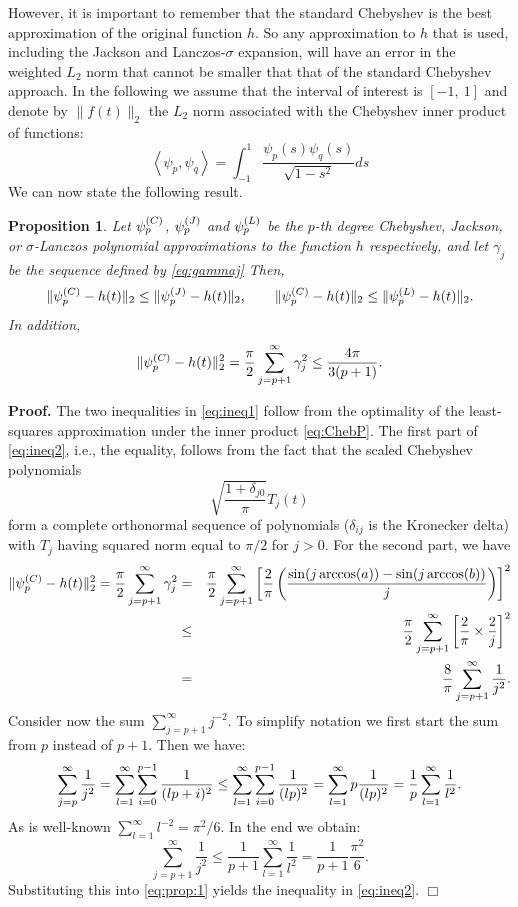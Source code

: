 \documentclass[12pt]{article}		\usepackage{tabls,multirow}
\newtheorem{proposition}{Proposition}[section]
\newenvironment{proof}{\begin{trivlist}
                       \item[]{\bf Proof.}
                       \hspace{0cm} }{\hfill $\Box$
                       \end{trivlist}}
\newcommand{\eq}[1]{\begin{equation}\label{#1}}
\newcommand{\en}{\end{equation}}
\begin{document}
However, it is important to remember that the standard Chebyshev is
the best approximation of the original function $h$. So any
approximation to $h$ that is used, including the Jackson and
Lanczos-$\sigma$ expansion, will have an error in the weighted $L_2$
norm that cannot be smaller that that of the standard Chebyshev
approach.  In the following we assume that the interval of interest is
$[-1, \ 1]$ and denote by $\| f(t)\|_2$ the $L_2$ norm associated with
the Chebyshev inner product of functions: \eq{eq:ChebP} \left\langle
  \psi_p, \psi_q \right\rangle = \int_{-1}^{1} \frac{\psi_p(s)
  \psi_q(s)}{\sqrt{1 - s^2}}ds \en We can now state the following
result.
\begin{proposition}\label{lem:ineq}
Let $\psi_p^{({C})}$, $\psi_p^{({J})}$ and $\psi_p^{({L})}$  
be the $p$-th degree Chebyshev,  Jackson, or
$\sigma$-Lanczos polynomial approximations to the function $h$
respectively, and let $\gamma_j$ be the sequence defined by 
\eqref{eq:gammaj} 
Then, 
\eq{eq:ineq1}
\| \psi_p\upp{C} -  h(t) \|_2 \le \| \psi_p\upp{J} -  h(t) \|_2, 
\qquad \| \psi_p\upp{C} -  h(t) \|_2 \le \| \psi_p\upp{L} -  h(t) \|_2 . 
\en
In addition, 
\eq{eq:ineq2}
\| \psi_p\upp{C} -  h(t) \|_2^2 = \frac{\pi}{2} \sum_{j=p+1}^\infty \gamma_j^2 \le \frac{4 \pi }{3(p+1)} .  
\en
\end{proposition} 
\begin{proof}
The two 
inequalities in \eqref{eq:ineq1} follow from the optimality of the least-squares
approximation under the inner product \eqref{eq:ChebP}.
The first part of  \eqref{eq:ineq2}, i.e., the equality, follows from 
the fact that the scaled Chebyshev polynomials 
\[ \sqrt{ \frac{1+ \delta_{j0}}{\pi}} T_j(t) \] form a complete
orthonormal sequence of polynomials ($\delta_{ij}$ is the Kronecker
delta) with $T_j$ having squared norm equal to $\pi/2$ for
$j>0$.  For the second part, we have
\begin{eqnarray} 
\| \psi_p^{({C})} -  h(t) \|_2^2 = \frac{\pi}{2} \sum_{j=p+1}^\infty \gamma_j^2 
&=&  
\frac{\pi}{2} \sum_{j=p+1}^\infty 
\left[
\frac{2}{\pi}\left(
 \frac{\sin(j\arccos(a)) - \sin(j\arccos(b))}{j}
\right)\right]^2 \nonumber  \\
&\le &  
\frac{\pi}{2} \sum_{j=p+1}^\infty 
\left[
\frac{2}{\pi} \times 
 \frac{2}{j}
\right]^2 \nonumber  \\
& = &
\frac{8}{ \pi }
\sum_{j=p+1}^\infty 
\frac{1}{j^2}  . \label{eq:prop:1}
\end{eqnarray} 
Consider now the sum $\sum_{j=p+1}^\infty j^{-2}$. To simplify notation
we first start the sum from $p$ instead of $p+1$. Then we have:
\[
\sum_{j=p}^\infty \frac{1}{j^2} 
=
\sum_{l=1}^\infty 
\sum_{i=0}^{p-1} 
\frac{1}{(l p +i)^2} \\
\le
\sum_{l=1}^\infty 
\sum_{i=0}^{p-1} 
\frac{1}{(l p)^2} \\
= \sum_{l=1}^\infty 
p 
\frac{1}{(l p)^2} 
= \frac{1}{p} 
\sum_{l=1}^\infty 
\frac{1}{l^2} .
\] 
As is well-known $\sum_{l=1}^\infty l^{-2} = \pi^2/6$.
In the end we obtain: 
\[
\sum_{j=p+1}^\infty 
\frac{1}{j^2} \le \frac{1}{p+1} 
\sum_{l=1}^\infty 
\frac{1}{l^2} =  \frac{1}{p+1} \frac{\pi^2}{6} . 
\]
Substituting this into \eqref{eq:prop:1} yields 
 the inequality in \eqref{eq:ineq2}.
\end{proof}
 
\end{document}
